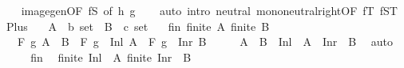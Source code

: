 \begin{isabellebody}
%
\isadelimproof
\ \ %
\endisadelimproof
%
\isatagproof
{}\isamarkupfalse%
\ image{\isacharunderscore}{\kern0pt}gen{\isacharbrackleft}{\kern0pt}OF\ fS{\isacharcomma}{\kern0pt}\ of\ h\ g{\isacharbrackright}{\kern0pt}\isanewline
\ \ \isamarkupfalse%
\ {\isacharparenleft}{\kern0pt}auto\ intro{\isacharcolon}{\kern0pt}\ neutral\ mono{\isacharunderscore}{\kern0pt}neutral{\isacharunderscore}{\kern0pt}right{\isacharbrackleft}{\kern0pt}OF\ fT\ fST{\isacharbrackright}{\kern0pt}{\isacharparenright}{\kern0pt}%
\endisatagproof
{\isafoldproof}%
%
\isadelimproof
\isanewline
%
\endisadelimproof
\isanewline
{}\isamarkupfalse%
\ Plus{\isacharcolon}{\kern0pt}\isanewline
\ \ \ A\ {\isacharcolon}{\kern0pt}{\isacharcolon}{\kern0pt}\ {\isachardoublequoteopen}{\isacharprime}{\kern0pt}b\ set{\isachardoublequoteclose}\ \ B\ {\isacharcolon}{\kern0pt}{\isacharcolon}{\kern0pt}\ {\isachardoublequoteopen}{\isacharprime}{\kern0pt}c\ set{\isachardoublequoteclose}\isanewline
\ \ \ fin{\isacharcolon}{\kern0pt}\ {\isachardoublequoteopen}finite\ A{\isachardoublequoteclose}\ {\isachardoublequoteopen}finite\ B{\isachardoublequoteclose}\isanewline
\ \ \ {\isachardoublequoteopen}F\ g\ {\isacharparenleft}{\kern0pt}A\ {\isacharless}{\kern0pt}{\isacharplus}{\kern0pt}{\isachargreater}{\kern0pt}\ B{\isacharparenright}{\kern0pt}\ {\isacharequal}{\kern0pt}\ F\ {\isacharparenleft}{\kern0pt}g\ {\isasymcirc}\ Inl{\isacharparenright}{\kern0pt}\ A\ \isactrlbold {\isacharasterisk}{\kern0pt}\ F\ {\isacharparenleft}{\kern0pt}g\ {\isasymcirc}\ Inr{\isacharparenright}{\kern0pt}\ B{\isachardoublequoteclose}\isanewline
%
\isadelimproof
%
\endisadelimproof
%
\isatagproof
{}\isamarkupfalse%
\ {\isacharminus}{\kern0pt}\isanewline
\ \ \isamarkupfalse%
\ {\isachardoublequoteopen}A\ {\isacharless}{\kern0pt}{\isacharplus}{\kern0pt}{\isachargreater}{\kern0pt}\ B\ {\isacharequal}{\kern0pt}\ Inl\ {\isacharbackquote}{\kern0pt}\ A\ {\isasymunion}\ Inr\ {\isacharbackquote}{\kern0pt}\ B{\isachardoublequoteclose}\ \isamarkupfalse%
\ auto\isanewline
\ \ \isamarkupfalse%
\ \isamarkupfalse%
\ fin\ \isamarkupfalse%
\ {\isachardoublequoteopen}finite\ {\isacharparenleft}{\kern0pt}Inl\ {\isacharbackquote}{\kern0pt}\ A{\isacharparenright}{\kern0pt}{\isachardoublequoteclose}\ {\isachardoublequoteopen}finite\ {\isacharparenleft}{\kern0pt}Inr\ {\isacharbackquote}{\kern0pt}\ B{\isacharparenright}{\kern0pt}{\isachardoublequoteclose}\ \isamarkupfalse%

\end{isabellebody}
